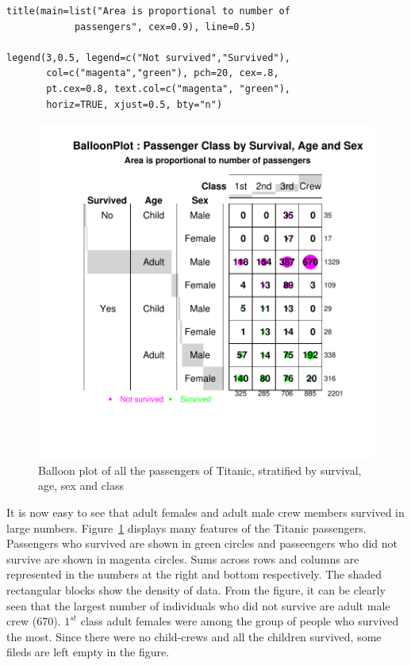 \documentclass[a4paper]{report}
\begin{document}
\begin{article}
{\begin{verbatim}
title(main=list("Area is proportional to number of
            passengers", cex=0.9), line=0.5)

legend(3,0.5, legend=c("Not survived","Survived"),
       col=c("magenta","green"), pch=20, cex=.8,
       pt.cex=0.8, text.col=c("magenta", "green"),
       horiz=TRUE, xjust=0.5, bty="n")

\end{verbatim}
 }

\begin{figure}
\includegraphics[width=\textwidth]{Figure4.pdf}
\caption{\label{figure:Figure4}
Balloon plot of all the passengers of Titanic, stratified by survival, age, sex
and class}
\end{figure}

It is now easy to see that adult females and adult male crew members
survived in large numbers. Figure~\ref{figure:Figure4} displays many
features of the Titanic passengers. Passengers who survived are
shown in green circles and passeengers who did not survive are shown
in magenta circles. Sums across rows and columns are represented in
the numbers at the right and bottom respectively.  The shaded
rectangular blocks show the density of data.  From the figure, it
can be clearly seen that the largest number of individuals who did
not survive are adult male crew (670). $1^{st}$ class adult females
were among the group of people who survived the most. Since there
were no child-crews and all the children survived, some fileds are
left empty in the figure. 






\end{article}
\end{document}
